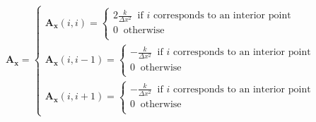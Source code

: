 \documentclass[12 pt, final]{article}
\begin{document}
\begin{itemize}
\begin{itemize}
            \begin{align*}
                    \mathbf{A_x} = \begin{cases}
                    \mathbf{A_x}(i,i) =
                    \begin{cases}
                    2\frac{k}{\Delta x^2} \: \text{ if $i$ corresponds to an interior point}\:\\
                    0 \: \text{ otherwise}\:\\
                    \end{cases}\\
                    \mathbf{A_x}(i,i-1) =
                    \begin{cases}
                    -\frac{k}{\Delta x^2} \: \text{ if $i$ corresponds to an interior point}\:\\
                    0 \: \text{ otherwise}\:\\
                    \end{cases}\\
                    \mathbf{A_x}(i,i+1) =
                    \begin{cases}
                    -\frac{k}{\Delta x^2} \: \text{ if $i$ corresponds to an interior point}\:\\
                    0 \: \text{ otherwise}\:\\
                    \end{cases}
                    \end{cases}
            \end{align*}

   
            

\end{itemize}
\end{itemize}
\end{document}
